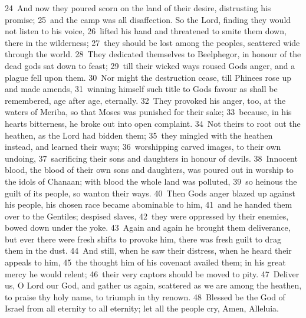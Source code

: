 \documentclass[10pt]{book} %
\begin{document}
\textcolor{benred8}{24}~And now they poured scorn on the land of their desire, distrusting his promise; \textcolor{benred8}{25}~and the camp was all disaffection. So the Lord, finding they would not listen to his voice, \textcolor{benred8}{26}~lifted his hand and threatened to smite them down, there in the wilderness; \textcolor{benred8}{27}~they should be lost among the peoples, scattered wide through the world. \textcolor{benred8}{28}~They dedicated themselves to Beelphegor, in honour of the dead gods sat down to feast; \textcolor{benred8}{29}~till their wicked ways roused God\textquotesingle s anger, and a plague fell upon them. \textcolor{benred8}{30}~Nor might the destruction cease, till Phinees rose up and made amends, \textcolor{benred8}{31}~winning himself such title to God\textquotesingle s favour as shall be remembered, age after age, eternally. \textcolor{benred8}{32}~They provoked his anger, too, at the waters of Meriba, so that Moses was punished for their sake; \textcolor{benred8}{33}~because, in his heart\textquotesingle s bitterness, he broke out into open complaint.
\textcolor{benred8}{34}~Not theirs to root out the heathen, as the Lord had bidden them; \textcolor{benred8}{35}~they mingled with the heathen instead, and learned their ways; \textcolor{benred8}{36}~worshipping carved images, to their own undoing, \textcolor{benred8}{37}~sacrificing their sons and daughters in honour of devils. \textcolor{benred8}{38}~Innocent blood, the blood of their own sons and daughters, was poured out in worship to the idols of Chanaan; with blood the whole land was polluted, \textcolor{benred8}{39}~so heinous the guilt of its people, so wanton their ways. \textcolor{benred8}{40}~Then God\textquotesingle s anger blazed up against his people, his chosen race became abominable to him, \textcolor{benred8}{41}~and he handed them over to the Gentiles; despised slaves, \textcolor{benred8}{42}~they were oppressed by their enemies, bowed down under the yoke. \textcolor{benred8}{43}~Again and again he brought them deliverance, but ever there were fresh shifts to provoke him, there was fresh guilt to drag them in the dust. \textcolor{benred8}{44}~And still, when he saw their distress, when he heard their appeals to him, \textcolor{benred8}{45}~the thought him of his covenant availed them; in his great mercy he would relent; \textcolor{benred8}{46}~their very captors should be moved to pity.
\textcolor{benred8}{47}~Deliver us, O Lord our God, and gather us again, scattered as we are among the heathen, to praise thy holy name, to triumph in thy renown. \textcolor{benred8}{48}~Blessed be the God of Israel from all eternity to all eternity; let all the people cry, Amen, Alleluia.
\end{document}
